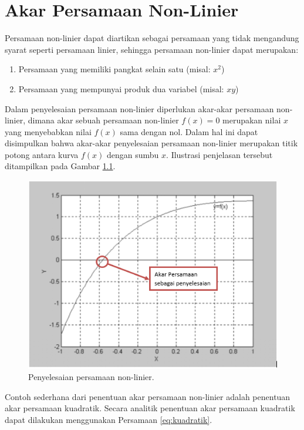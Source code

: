 \documentclass[]{book}
\providecommand{\tightlist}{%
  \setlength{\itemsep}{0pt}\setlength{\parskip}{0pt}}
\theoremstyle{definition}
\theoremstyle{definition}
\theoremstyle{definition}
\theoremstyle{remark}
\begin{document}
\hypertarget{rootfinding}{%
\chapter{Akar Persamaan Non-Linier}\label{rootfinding}}

Persamaan non-linier dapat diartikan sebagai persamaan yang tidak mengandung syarat seperti persamaan linier, sehingga persamaan non-linier dapat merupakan:

\begin{enumerate}
\def\labelenumi{\alph{enumi}.}
\tightlist
\item
  Persamaan yang memiliki pangkat selain satu (misal: \(x^2\))
\item
  Persamaan yang mempunyai produk dua variabel (misal: \(xy\))
\end{enumerate}

Dalam penyelesaian persamaan non-linier diperlukan akar-akar persamaan non-linier, dimana akar sebuah persamaan non-linier \(f\left(x\right)=0\) merupakan nilai \(x\) yang menyebabkan nilai \(f\left(x\right)\) sama dengan nol. Dalam hal ini dapat disimpulkan bahwa akar-akar penyelesaian persamaan non-linier merupakan titik potong antara kurva \(f\left(x\right)\) dengan sumbu \(x\). Ilustrasi penjelasan tersebut ditampilkan pada Gambar \ref{fig:root}.

\begin{figure}

{\centering \includegraphics[width=0.8\linewidth]{./images/root} 

}

\caption{Penyelesaian persamaan non-linier.}\label{fig:root}
\end{figure}

Contoh sederhana dari penentuan akar persamaan non-linier adalah penentuan akar persamaan kuadratik. Secara analitik penentuan akar persamaan kuadratik dapat dilakukan menggunakan Persamaan \eqref{eq:kuadratik}.
\end{document}
